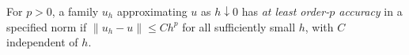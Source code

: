 
For $p>0$, a family $u_h$ approximating $u$ as $h\downarrow0$ has \emph{at least order-$p$ accuracy} in a specified norm if $\|u_h-u\|\le C h^p$ for all sufficiently small $h$, with $C$ independent of $h$.
